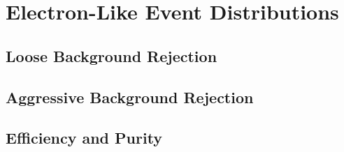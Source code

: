 
\section{Electron-Like Event Distributions}

\subsection{Loose Background Rejection}

\subsection{Aggressive Background Rejection}

\subsection{Efficiency and Purity}